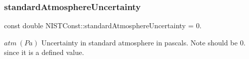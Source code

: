 \subsubsection{\texorpdfstring{standard\+Atmosphere\+Uncertainty}{standardAtmosphereUncertainty}}
{\footnotesize\ttfamily const double N\+I\+S\+T\+Const\+::standard\+Atmosphere\+Uncertainty = 0.}

$atm \ (Pa)$ Uncertainty in standard atmosphere in pascals. Note should be 0. since it is a defined value. 